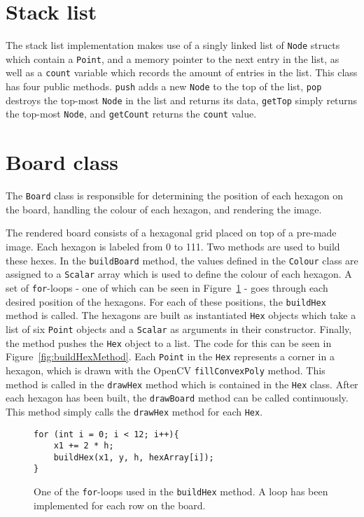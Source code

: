 \section{Stack list}
The stack list implementation makes use of a singly linked list of \texttt{Node} structs which contain a \texttt{Point}, and a memory pointer to the next entry in the list, as well as a \texttt{count} variable which records the amount of entries in the list. This class has four public methods. \texttt{push} adds a new \texttt{Node} to the top of the list, \texttt{pop} destroys the top-most \texttt{Node} in the list and returns its data, \texttt{getTop} simply returns the top-most \texttt{Node}, and \texttt{getCount} returns the \texttt{count} value.


\section{Board class}
The \texttt{Board} class is responsible for determining the position of each hexagon on the board, handling the colour of each hexagon, and rendering the image. 

The rendered board consists of a hexagonal grid placed on top of a pre-made image. Each hexagon is labeled from 0 to 111. Two methods are used to build these hexes. In the \texttt{buildBoard} method, the values defined in the \texttt{Colour} class are assigned to a \texttt{Scalar} array which is used to define the colour of each hexagon. A set of \texttt{for}-loops - one of which can be seen in Figure~\ref{fig:buildHexForLoop} - goes through each desired position of the hexagons. For each of these positions, the \texttt{buildHex} method is called. The hexagons are built as instantiated \texttt{Hex} objects which take a list of six \texttt{Point} objects and a \texttt{Scalar} as arguments in their constructor. Finally, the method pushes the \texttt{Hex} object to a list. The code for this can be seen in Figure~\ref{fig:buildHexMethod}. Each \texttt{Point} in the \texttt{Hex} represents a corner in a hexagon, which is drawn with the OpenCV \texttt{fillConvexPoly} method. This method is called in the \texttt{drawHex} method which is contained in the \texttt{Hex} class. After each hexagon has been built, the \texttt{drawBoard} method can be called continuously. This method simply calls the \texttt{drawHex} method for each \texttt{Hex}.

\begin{figure}[!h]
\begin{lstlisting}
for (int i = 0; i < 12; i++){
	x1 += 2 * h;
	buildHex(x1, y, h, hexArray[i]);
}
\end{lstlisting}
\caption{One of the \texttt{for}-loops used in the \texttt{buildHex} method. A loop has been implemented for each row on the board. \label{fig:buildHexForLoop}}
\end{figure}

